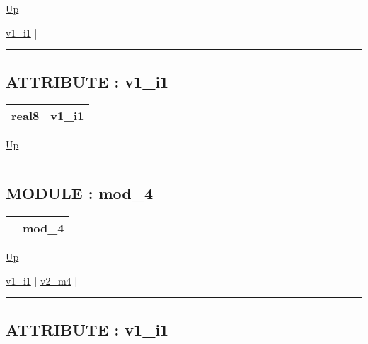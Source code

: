 \hyperlink{ecldoc:intest.inintest.example_2}{Up}

\par


\hyperlink{ecldoc:intest.inintest.example_2.iface_1.v1_i1}{v1\_i1}  |

\rule{\textwidth}{0.4pt}

\subsection*{ATTRIBUTE : v1\_i1}
\hypertarget{ecldoc:intest.inintest.example_2.iface_1.v1_i1}{}

{\renewcommand{\arraystretch}{1.5}
\begin{tabularx}{\textwidth}{|>{\raggedright\arraybackslash}l|X|}
\hline
\hspace{0pt}real8 & v1\_i1 \\
\hline
\end{tabularx}
}

\hyperlink{ecldoc:intest.inintest.example_2.iface_1}{Up}

\par


\rule{\textwidth}{0.4pt}


\subsection*{MODULE : mod\_4}
\hypertarget{ecldoc:intest.inintest.example_2.mod_4}{}

{\renewcommand{\arraystretch}{1.5}
\begin{tabularx}{\textwidth}{|>{\raggedright\arraybackslash}l|X|}
\hline
\hspace{0pt} & mod\_4 \\
\hline
\end{tabularx}
}

\hyperlink{ecldoc:intest.inintest.example_2}{Up}

\par


\hyperlink{ecldoc:intest.inintest.example_2.mod_4.v1_i1}{v1\_i1}  |
\hyperlink{ecldoc:intest.inintest.example_2.mod_4.v2_m4}{v2\_m4}  |

\rule{\textwidth}{0.4pt}

\subsection*{ATTRIBUTE : v1\_i1}
\hypertarget{ecldoc:intest.inintest.example_2.mod_4.v1_i1}{}

